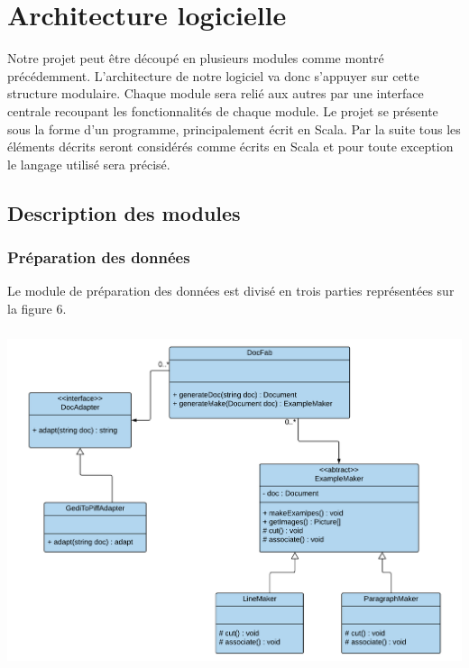 \chapter{Architecture logicielle}

Notre projet peut être découpé en plusieurs modules comme montré précédemment.
L’architecture de notre logiciel va donc s’appuyer sur cette structure
modulaire. Chaque module sera relié aux autres par une interface centrale
recoupant les fonctionnalités de chaque module.
Le projet se présente sous la forme d’un programme, principalement écrit en Scala.
Par la suite tous les éléments décrits seront considérés comme écrits en Scala
et pour toute exception le langage utilisé sera précisé.

\section{Description des modules}

\subsection{Préparation des données}

Le module de préparation des données est divisé en trois parties représentées
sur la figure 6.

\paragraph{}

\begin{mdframed}[frametitle={Figure 6 : Diagramme de classes de la partie préparation des données}, innerbottommargin=10]
\begin{center}
\includegraphics[scale=0.5]{prepa-data.pdf}
\end{center}
\end{mdframed}

